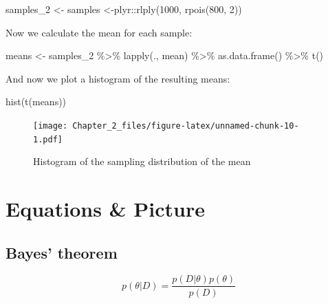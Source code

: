 \documentclass[
]{book}
\newenvironment{Shaded}{\begin{snugshade}}{\end{snugshade}}
\newcommand{\DecValTok}[1]{\textcolor[rgb]{0.00,0.00,0.81}{#1}}
\newcommand{\FunctionTok}[1]{\textcolor[rgb]{0.00,0.00,0.00}{#1}}
\newcommand{\NormalTok}[1]{#1}
\newcommand{\OtherTok}[1]{\textcolor[rgb]{0.56,0.35,0.01}{#1}}
\newcommand{\SpecialCharTok}[1]{\textcolor[rgb]{0.00,0.00,0.00}{#1}}
\begin{document}
\begin{Shaded}
\begin{Highlighting}[]
\NormalTok{samples\_2 }\OtherTok{\textless{}{-}}\NormalTok{ samples }\OtherTok{\textless{}{-}}\NormalTok{plyr}\SpecialCharTok{::}\FunctionTok{rlply}\NormalTok{(}\DecValTok{1000}\NormalTok{, }\FunctionTok{rpois}\NormalTok{(}\DecValTok{800}\NormalTok{, }\DecValTok{2}\NormalTok{))}
\end{Highlighting}
\end{Shaded}

Now we calculate the mean for each sample:

\begin{Shaded}
\begin{Highlighting}[]
\NormalTok{means }\OtherTok{\textless{}{-}}\NormalTok{ samples\_2 }\SpecialCharTok{\%\textgreater{}\%}
  \FunctionTok{lapply}\NormalTok{(., mean) }\SpecialCharTok{\%\textgreater{}\%}
  \FunctionTok{as.data.frame}\NormalTok{() }\SpecialCharTok{\%\textgreater{}\%}
  \FunctionTok{t}\NormalTok{()}
\end{Highlighting}
\end{Shaded}

And now we plot a histogram of the resulting means:

\begin{Shaded}
\begin{Highlighting}[]
\FunctionTok{hist}\NormalTok{(}\FunctionTok{t}\NormalTok{(means))}
\end{Highlighting}
\end{Shaded}

\begin{figure}
\centering
\texttt{[image: Chapter\_2\_files/figure-latex/unnamed-chunk-10-1.pdf]}
\caption{\label{fig:unnamed-chunk-10}Histogram of the sampling distribution of the mean}
\end{figure}

\hypertarget{equations-picture}{%
\chapter{Equations \& Picture}\label{equations-picture}}

\hypertarget{bayes-theorem}{%
\section{Bayes' theorem}\label{bayes-theorem}}

\begin{equation} 
p(\theta | D) = \frac{p(D|\theta) p(\theta)} {p(D)}
\label{eq:bayes}
\end{equation}
\end{document}
